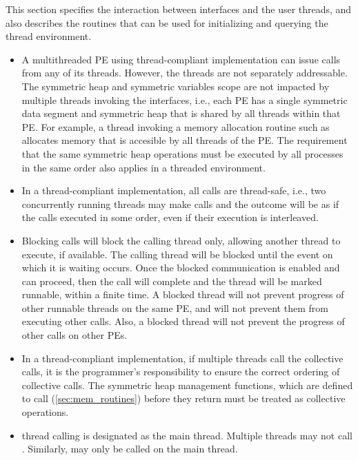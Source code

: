 This section specifies the interaction between \openshmem{} interfaces and the
user threads, and also describes the routines that can be used for initializing and 
querying the thread environment.
 

\begin{itemize}

\item
A multithreaded \openshmem{} \ac{PE} using thread-compliant implementation can issue
\openshmem{} calls from  any of its threads. However, the threads
are not separately addressable. The symmetric heap and symmetric variables scope
are not impacted by multiple threads invoking the
\openshmem{} interfaces, i.e., 
each \ac{PE} has a single symmetric data segment and symmetric heap that is shared by
all threads within that \ac{PE}.  For example, a thread invoking a memory allocation
routine such as  
allocates memory that is accesible by all threads of the \ac{PE}. 
The requirement that the same symmetric heap operations must
be executed by all processes in the same order also applies in a threaded
environment. 
                                    	
\item In a thread-compliant implementation, 
all \openshmem{} calls are thread-safe, i.e., two concurrently running threads
may make \openshmem{} calls and the outcome will be as if the calls executed in
some order, even if their execution is interleaved.

\item Blocking \openshmem{} calls will block the calling thread only, allowing another
thread to execute, if available. The calling thread will be blocked until the
event on which it is waiting occurs. Once the blocked communication is enabled
and can proceed, then the call will complete and the thread will be marked
runnable, within a finite time. A blocked thread will not prevent progress of
other runnable threads on the same \ac{PE}, and will not prevent them from
executing other \openshmem{} calls. Also, a blocked thread will not prevent the
progress of other \openshmem{} calls on other \acp{PE}. 
 
\item
In a thread-compliant implementation, if multiple threads call the collective
calls, it is the programmer's responsibility to ensure the correct ordering of
collective calls.  The symmetric heap management functions, which are defined to call
(\ref{sec:mem_routines}) before they return 
must be treated as collective operations.

\item
\openshmem{} thread calling  is designated as the main
thread. Multiple threads may not call . Similarly,
 may only be called on the main thread.

\end{itemize} 
 
